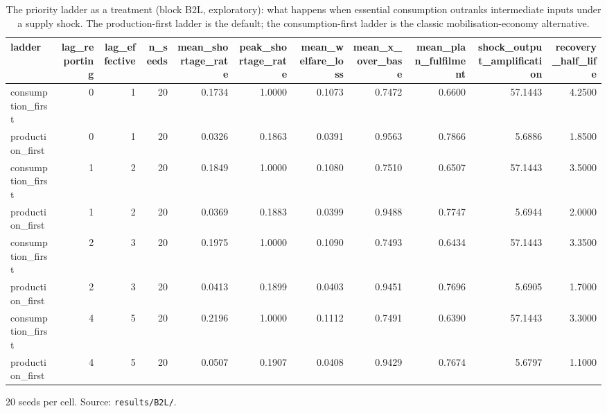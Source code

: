 \begin{table}[htbp]
\centering
\caption{The priority ladder as a treatment (block B2L, exploratory): what happens when essential consumption outranks intermediate inputs under a supply shock. The production-first ladder is the default; the consumption-first ladder is the classic mobilisation-economy alternative.}
\label{tab:ladder}
\begin{tabular}{lrrrrrrrrrr}
\toprule
ladder & lag\_reporting & lag\_effective & n\_seeds & mean\_shortage\_rate & peak\_shortage\_rate & mean\_welfare\_loss & mean\_x\_over\_base & mean\_plan\_fulfilment & shock\_output\_amplification & recovery\_half\_life \\
\midrule
consumption\_first & 0 & 1 & 20 & 0.1734 & 1.0000 & 0.1073 & 0.7472 & 0.6600 & 57.1443 & 4.2500 \\
production\_first & 0 & 1 & 20 & 0.0326 & 0.1863 & 0.0391 & 0.9563 & 0.7866 & 5.6886 & 1.8500 \\
consumption\_first & 1 & 2 & 20 & 0.1849 & 1.0000 & 0.1080 & 0.7510 & 0.6507 & 57.1443 & 3.5000 \\
production\_first & 1 & 2 & 20 & 0.0369 & 0.1883 & 0.0399 & 0.9488 & 0.7747 & 5.6944 & 2.0000 \\
consumption\_first & 2 & 3 & 20 & 0.1975 & 1.0000 & 0.1090 & 0.7493 & 0.6434 & 57.1443 & 3.3500 \\
production\_first & 2 & 3 & 20 & 0.0413 & 0.1899 & 0.0403 & 0.9451 & 0.7696 & 5.6905 & 1.7000 \\
consumption\_first & 4 & 5 & 20 & 0.2196 & 1.0000 & 0.1112 & 0.7491 & 0.6390 & 57.1443 & 3.3000 \\
production\_first & 4 & 5 & 20 & 0.0507 & 0.1907 & 0.0408 & 0.9429 & 0.7674 & 5.6797 & 1.1000 \\
\bottomrule
\end{tabular}
\par\smallskip
\begin{minipage}{\linewidth}\footnotesize 20 seeds per cell. Source: \texttt{results/B2L/}.\end{minipage}
\end{table}
